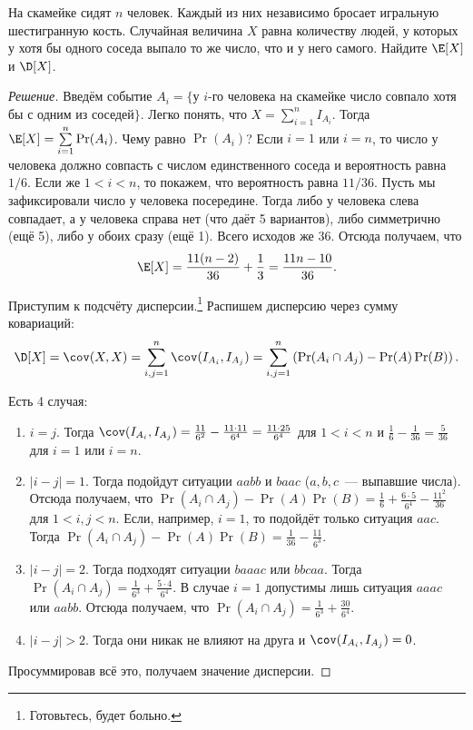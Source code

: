 \begin{problem}
    На скамейке сидят \(n\) человек. Каждый из них независимо бросает игральную шестигранную кость. Случайная величина \(X\) равна количеству людей, у которых у хотя бы одного соседа выпало то же число, что и у него самого. Найдите \(\E[X]\) и \(\D[X]\).
\end{problem}
\begin{proof}[Решение]
    Введём событие \(A_i = \{\)у \(i\)-го человека на скамейке число совпало хотя бы с одним из соседей\(\}\). Легко понять, что \(X = \sum\limits_{i = 1}^{n} I_{A_i}\). Тогда \(\E[X] = \sum\limits_{i = 1}^{n} \Pr(A_i)\). Чему равно \(\Pr(A_i)\)? Если \(i = 1\) или \(i = n\), то число у человека должно совпасть с числом единственного соседа и вероятность равна \(1/6\). Если же \(1 < i < n\), то покажем, что вероятность равна \(11/36\). Пусть мы зафиксировали число у человека посередине. Тогда либо у человека слева совпадает, а у человека справа нет (что даёт 5 вариантов), либо симметрично (ещё 5), либо у обоих сразу (ещё 1). Всего исходов же 36. Отсюда получаем, что \[\E[X] = \dfrac{11(n - 2)}{36} + \dfrac{1}{3} = \dfrac{11n - 10}{36}.\]
    
    Приступим к подсчёту дисперсии.\footnote{Готовьтесь, будет больно.} Распишем дисперсию через сумму ковариаций:
    \[\D[X] = \cov(X, X) = \sum_{i, j = 1}^{n} \cov(I_{A_i}, I_{A_j}) = \sum_{i, j = 1}^{n} \left(\Pr(A_i \cap A_j) - \Pr(A)\Pr(B)\right).\]
    
    Есть 4 случая:
    \begin{enumerate}
        \item \(i = j\). Тогда \(\cov(I_{A_i}, I_{A_j}) = \frac{11}{6^2} - \frac{11 \cdot 11}{6^4} = \frac{11 \cdot 25}{6^4}\) для \(1 < i < n\) и \(\frac{1}{6} - \frac{1}{36} = \frac{5}{36}\) для \(i = 1\) или \(i = n\).
        \item \(|i - j| = 1\). Тогда подойдут ситуации \(aabb\) и \(baac\) (\(a, b, c\)~--- выпавшие числа). Отсюда получаем, что \(\Pr(A_i \cap A_j) - \Pr(A)\Pr(B) = \frac{1}{6} + \frac{6 \cdot 5}{6^4} - \frac{11^2}{36}\) для \(1 < i,j < n\). Если, например, \(i = 1\), то подойдёт только ситуация \(aac\). Тогда \(\Pr(A_i \cap A_j) - \Pr(A)\Pr(B) = \frac{1}{36} - \frac{11}{6^3}\).
        \item \(|i - j| = 2\). Тогда подходят ситуации \(baaac\) или \(bbcaa\). Тогда \(\Pr(A_i \cap A_j) = \frac{1}{6^3} + \frac{5 \cdot 4}{6^4}\). В случае \(i = 1\) допустимы лишь ситуация \(aaac\) или \(aabb\). Отсюда получаем, что \(\Pr(A_i \cap A_j) = \frac{1}{6^3} + \frac{30}{6^4}\).
        \item \(|i - j| > 2\). Тогда они никак не влияют на друга и \(\cov(I_{A_i}, I_{A_j}) = 0\).
    \end{enumerate}
    
    Просуммировав всё это, получаем значение дисперсии.
\end{proof}


